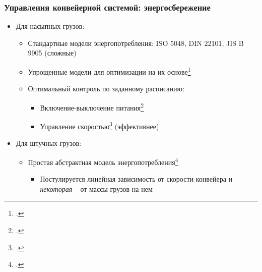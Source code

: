 \documentclass{beamer}
\begin{document}
\begin{frame}
  \frametitle{Управления конвейерной системой: энергосбережение}
  \begin{itemize}
  \item Для насыпных грузов:
    \begin{itemize}
    \item Стандартные модели энергопотребления: ISO 5048, DIN 22101, JIS B 9905 (сложные)
    \item Упрощенные модели для оптимизации на их основе\footcite{zhang2011modeling}
    \item Оптимальный контроль по заданному расписанию:
      \begin{itemize}
      \item Включение-выключение питания\footcite{middelberg2009optimal}
      \item Управление скоростью\footcite{zhang2010optimal} (эффективнее)
      \end{itemize}
    \end{itemize}
  \item Для штучных грузов:
    \begin{itemize}
    \item Простая абстрактная модель энергопотребления\footcite{halepoto2016design}
      \begin{itemize}
      \item Постулируется линейная зависимость от скорости конвейера и \textit{некоторая} -- от массы грузов на нем
      \end{itemize} 
    \end{itemize} 
  \end{itemize}
\end{frame}
\end{document}
